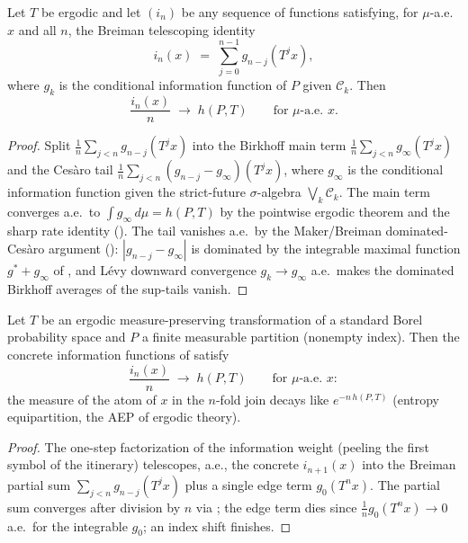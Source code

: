 \begin{theorem}\label{ae_tendsto_div_infoFun}
  \leanok
  Let \(T\) be ergodic and let \((i_n)\) be any sequence of functions satisfying, for
  \(\mu\)-a.e.\ \(x\) and all \(n\), the Breiman telescoping identity
  \[
    i_n(x) \;=\; \sum_{j=0}^{n-1} g_{n-j}(T^{j}x),
  \]
  where \(g_k\) is the conditional information function of \(P\) given \(\mathcal C_k\). Then
  \[
    \frac{i_n(x)}{n} \;\longrightarrow\; h(P,T)
    \qquad\text{for \(\mu\)-a.e.\ } x.
  \]
\end{theorem}
\begin{proof}\leanok
  Split \(\tfrac1n\sum_{j<n} g_{n-j}(T^jx)\) into the Birkhoff main term
  \(\tfrac1n\sum_{j<n} g_\infty(T^jx)\) and the Ces\`aro tail
  \(\tfrac1n\sum_{j<n}(g_{n-j}-g_\infty)(T^jx)\), where \(g_\infty\) is the conditional
  information function given the strict-future \(\sigma\)-algebra \(\bigvee_k \mathcal C_k\). The
  main term converges a.e.\ to \(\int g_\infty\,d\mu = h(P,T)\) by the pointwise ergodic theorem
  and the sharp rate identity (). The tail vanishes
  a.e.\ by the Maker/Breiman dominated-Ces\`aro argument
  (): \(|g_{n-j}-g_\infty|\) is dominated by the integrable
  maximal function \(g^{*} + g_\infty\) of , and L\'evy downward convergence
  \(g_k \to g_\infty\) a.e.\ makes the dominated Birkhoff averages of the sup-tails vanish.
\end{proof}

\begin{theorem}\label{ae_tendsto_div_infoFun_self}
  \leanok
  Let \(T\) be an ergodic measure-preserving transformation of a standard Borel probability space
  and \(P\) a finite measurable partition (nonempty index). Then the concrete information
  functions of  satisfy
  \[
    \frac{i_n(x)}{n} \;\longrightarrow\; h(P,T)
    \qquad\text{for \(\mu\)-a.e.\ } x :
  \]
  the measure of the atom of \(x\) in the \(n\)-fold join decays like \(e^{-n\,h(P,T)}\)
  (entropy equipartition, the AEP of ergodic theory).
\end{theorem}
\begin{proof}\leanok
  The one-step factorization of the information weight (peeling the first symbol of the itinerary)
  telescopes, a.e., the concrete \(i_{n+1}(x)\) into the Breiman partial sum
  \(\sum_{j<n} g_{n-j}(T^jx)\) plus a single edge term \(g_0(T^n x)\). The partial sum converges
  after division by \(n\) via ; the edge term dies since
  \(\tfrac1n g_0(T^n x) \to 0\) a.e.\ for the integrable \(g_0\); an index shift finishes.
\end{proof}

